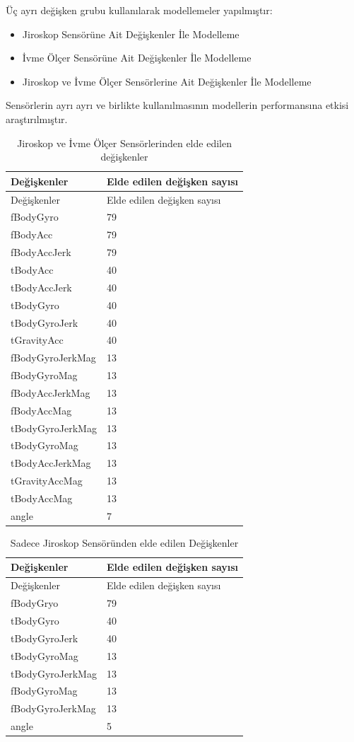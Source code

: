 \documentclass[12pt,twoside]{deuthesis}
\providecommand{\tightlist}{%
  \setlength{\itemsep}{0pt}\setlength{\parskip}{0pt}}
\begin{document}
Üç ayrı değişken grubu kullanılarak modellemeler yapılmıştır:
\begin{itemize}
\tightlist
\item
  Jiroskop Sensörüne Ait Değişkenler İle Modelleme
\item
  İvme Ölçer Sensörüne Ait Değişkenler İle Modelleme
\item
  Jiroskop ve İvme Ölçer Sensörlerine Ait Değişkenler İle Modelleme
\end{itemize}
Sensörlerin ayrı ayrı ve birlikte kullanılmasının modellerin performansına etkisi araştırılmıştır.
\begin{longtable}[]{@{}ll@{}}
\caption{\label{tab:nvar} Jiroskop ve İvme Ölçer Sensörlerinden elde edilen değişkenler}\tabularnewline
\toprule()
Değişkenler & Elde edilen değişken sayısı \\
\midrule()
\endfirsthead
\toprule()
Değişkenler & Elde edilen değişken sayısı \\
\midrule()
\endhead
fBodyGyro & 79 \\
fBodyAcc & 79 \\
fBodyAccJerk & 79 \\
tBodyAcc & 40 \\
tBodyAccJerk & 40 \\
tBodyGyro & 40 \\
tBodyGyroJerk & 40 \\
tGravityAcc & 40 \\
fBodyGyroJerkMag & 13 \\
fBodyGyroMag & 13 \\
fBodyAccJerkMag & 13 \\
fBodyAccMag & 13 \\
tBodyGyroJerkMag & 13 \\
tBodyGyroMag & 13 \\
tBodyAccJerkMag & 13 \\
tGravityAccMag & 13 \\
tBodyAccMag & 13 \\
angle & 7 \\
\bottomrule()
\end{longtable}
\begin{longtable}[]{@{}ll@{}}
\caption{\label{tab:nvargyro} Sadece Jiroskop Sensöründen elde edilen Değişkenler}\tabularnewline
\toprule()
Değişkenler & Elde edilen değişken sayısı \\
\midrule()
\endfirsthead
\toprule()
Değişkenler & Elde edilen değişken sayısı \\
\midrule()
\endhead
fBodyGryo & 79 \\
tBodyGyro & 40 \\
tBodyGyroJerk & 40 \\
tBodyGyroMag & 13 \\
tBodyGyroJerkMag & 13 \\
fBodyGyroMag & 13 \\
fBodyGyroJerkMag & 13 \\
angle & 5 \\
\bottomrule()
\end{longtable}
\end{document}
